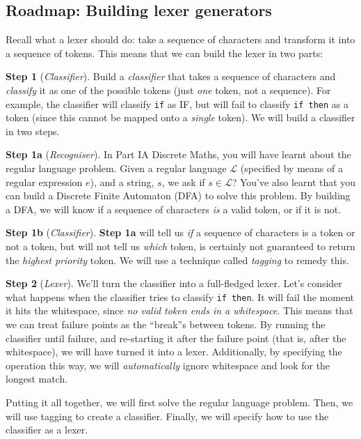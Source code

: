 \subsection{Roadmap: Building lexer generators}
Recall what a lexer should do: take a sequence of characters and transform it into a sequence of tokens. This means that we can build the lexer in two parts:

\textbf{Step 1} (\textit{Classifier}). Build a \textit{classifier} that takes a sequence of characters and \emph{classify} it as one of the possible tokens (just \emph{one} token, not a sequence). For example, the classifier will classify \texttt{if} as IF, but will fail to classify \texttt{if then} as a token (since this cannot be mapped onto a \emph{single} token). We will build a classifier in two steps.

\begin{addmargin}[1cm]{0cm}
\textbf{Step 1a} (\textit{Recogniser}). In {\sffamily Part IA Discrete Maths}, you will have learnt about the regular language problem. Given a regular language $\mathcal{L}$ (specified by means of a regular expression $e$), and a string, $s$, we ask if $s \in \mathcal{L}$? You've also learnt that you can build a Discrete Finite Automaton (DFA) to solve this problem. By building a DFA, we will know if a sequence of characters \emph{is} a valid token, or if it is not.

\textbf{Step 1b} (\textit{Classifier}). \textbf{Step 1a} will tell us \emph{if} a sequence of characters is a token or not a token, but will not tell us \emph{which} token, is certainly not guaranteed to return the \emph{highest priority} token. We will use a technique called \emph{tagging} to remedy this. 
\end{addmargin}

\textbf{Step 2} (\textit{Lexer}). We'll turn the classifier into a full-fledged lexer. Let's consider what happens when the classifier tries to classify \texttt{if then}. It will fail the moment it hits the whitespace, since \emph{no valid token ends in a whitespace}. This means that we can treat failure points as the ``break''s between tokens. By running the classifier until failure, and re-starting it after the failure point (that is, after the whitespace), we will have turned it into a lexer. Additionally, by specifying the operation this way, we will \emph{automatically} ignore whitespace and look for the longest match. 



Putting it all together, we will first solve the regular language problem. Then, we will use tagging to create a classifier. Finally, we will specify how to use the classifier as a lexer.

